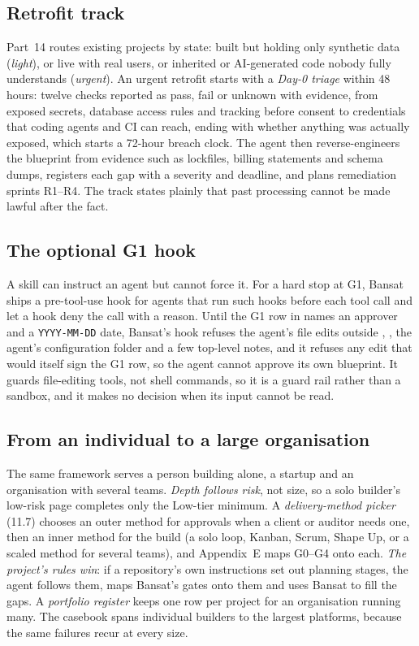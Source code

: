 \documentclass[11pt,a4paper]{article}
\DeclareRobustCommand{\fpath}[1]{\path{#1}}
\begin{document}
\subsection{Retrofit track}\label{sec:retrofit}
Part~14 routes existing projects by state: built but holding only synthetic data (\emph{light}), or live with real
users, or inherited or AI-generated code nobody fully understands (\emph{urgent}). An urgent retrofit starts with a
\emph{Day-0 triage} within 48 hours: twelve checks reported as pass, fail or unknown with evidence, from exposed secrets,
database access rules and tracking before consent to credentials that coding agents and CI can reach, ending with
whether anything was actually exposed, which starts a 72-hour breach clock. The agent then
reverse-engineers the blueprint from evidence such as lockfiles, billing statements and schema dumps, registers each gap
with a severity and deadline, and plans remediation sprints R1--R4. The track states plainly that past processing cannot be made lawful after the fact.

\subsection{The optional G1 hook}
A skill can instruct an agent but cannot force it. For a hard stop at G1, Bansat ships a pre-tool-use
hook for agents that run such hooks before each tool call and let a hook deny the call with a reason.
Until the G1 row in \fpath{docs/BLUEPRINT.md} names an approver and a \texttt{YYYY-MM-DD} date, Bansat's hook refuses the
agent's file edits outside \fpath{docs/}, \fpath{spikes/}, the agent's configuration folder and a few top-level notes, and it refuses any
edit that would itself sign the G1 row, so the agent cannot approve its own blueprint. It guards file-editing tools, not
shell commands, so it is a guard rail rather than a sandbox, and it makes no decision when its input cannot be read.

\subsection{From an individual to a large organisation}\label{sec:scale}
The same framework serves a person building alone, a startup and an organisation with several teams. \emph{Depth follows risk}, not
size, so a solo builder's low-risk page completes only the Low-tier minimum. A \emph{delivery-method picker} (11.7) chooses an outer method for approvals when a client or auditor needs one, then
an inner method for the build (a solo loop, Kanban, Scrum, Shape Up, or a scaled method for several teams), and
Appendix~E maps G0--G4 onto each. \emph{The project's rules win}: if a repository's own instructions set out
planning stages, the agent follows them, maps Bansat's gates onto them and uses Bansat to fill the gaps. A
\emph{portfolio register} keeps one row per project for an organisation running many. The casebook spans individual builders to the
largest platforms, because the same failures recur at every size.
\end{document}
